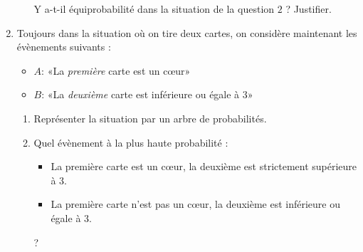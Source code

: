 \documentclass[
	classe=$2^{de}$
]{exercice}
\begin{document}
\begin{enumerate}
\begin{enumerate}
		            Y a-t-il équiprobabilité dans la situation de la question $2$ ? Justifier. 
	      \end{enumerate}

	\item Toujours dans la situation où on tire deux cartes, on considère maintenant les évènements suivants :
	      \begin{itemize}
		      \item $A$: «La \textit{première} carte est un cœur»
		      \item $B$: «La \textit{deuxième} carte est inférieure ou égale à $3$»
	      \end{itemize}
	      \begin{enumerate}
		      \item Représenter la situation par un arbre de probabilités.
		      \item Quel évènement à la plus haute probabilité :
		            \begin{itemize}
			            \item La première carte est un cœur, la deuxième est strictement supérieure à $3$.
			            \item La première carte n'est pas un cœur, la deuxième est inférieure ou égale à $3$.
		            \end{itemize}
		            ?
	      \end{enumerate}
\end{enumerate}
\end{document}
